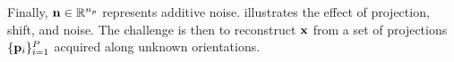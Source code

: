 Finally, $\mathbf{n} \in \mathbb{R}^{n_p}$ represents additive noise.
 illustrates the effect of projection, shift, and noise.
The challenge is then to reconstruct $\mathbf{x}$ from a set of projections $\{\mathbf{p}_i\}_{i=1}^P$ acquired along unknown orientations.


